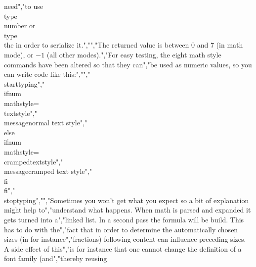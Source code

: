 need","to use \\type {\\number} or \\type {\\the} in order to serialize it.","","The returned value is between 0 and 7 (in math mode), or $-1$ (all other modes).","For easy testing, the eight math style commands have been altered so that they can","be used as numeric values, so you can write code like this:","","\\starttyping","\\ifnum\\mathstyle=\\textstyle","    \\message{normal text style}","\\else \\ifnum\\mathstyle=\\crampedtextstyle","    \\message{cramped text style}","\\fi \\fi","\\stoptyping","","Sometimes you won't get what you expect so a bit of explanation might help to","understand what happens. When math is parsed and expanded it gets turned into a","linked list. In a second pass the formula will be build. This has to do with the","fact that in order to determine the automatically chosen sizes (in for instance","fractions) following content can influence preceding sizes. A side effect of this","is for instance that one cannot change the definition of a font family (and","thereby reusing 